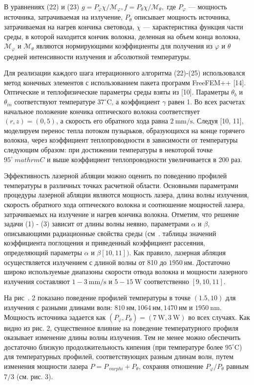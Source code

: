 В уравнениях (22) и (23)
$g=P_{\varphi} \chi / \mathcal{M}_{\varphi}, f=P_{\theta} \chi / \mathcal{M}_{ \theta},$
где $P_{\varphi}$ — мощность источника, затрачиваемая на излучение, $P_{\theta}$ описывает мощность источника,
затрачиваемая на нагрев кончика световода, $\chi$ — характеристика функция части среды,
в которой находится кончик волокна, деленная на объем конца волокна,
$\mathcal{M}_{\varphi}$ и $\mathcal{M}_{\theta}$ являются нормирующими коэффициенты для получения
из $\varphi$ и $\theta$ средней интенсивности излучения и абсолютной температуры.

Для реализации каждого шага итерационного алгоритма (22)-(25) использовался метод конечных
элементов с использованием пакета программ FreeFEM++ [14].
Оптические и теплофизические параметры среды взяты из [10].
Параметры $\theta_{b}$ и $\theta_{i n}$ соответствуют температуре $37^{\circ}\mathrm{C}$,
а коэффициент $\gamma$ равен 1.
Во всех расчетах начальное положение кончика оптического волокна соответствует
$(r, z)=(0,5)$, а скорость его обратного хода равна $2 \mathrm{~mm} / \mathrm{s}$.
Следуя [10, 11], моделируем перенос тепла потоком пузырьков, образующихся на конце горячего волокна,
через коэффициент теплопроводности в зависимости от температуры следующим образом:
при достижении температуры в некоторой точке $95^{\circ} \ mathrm{C}$ и выше коэффициент
теплопроводности увеличивается в 200 раз.

Эффективность лазерной абляции можно оценить по поведению профилей
температуры в различных точках расчетной области.
Основными параметрами процедуры лазерной абляции являются мощность лазера, длина волны излучения,
скорость обратного хода оптического волокна и соотношение мощностей лазера,
затрачиваемых на излучение и нагрев кончика волокна.
Отметим, что решение задачи (1) - (3) зависит от длины волны неявно,
параметрами $\alpha$ и $\beta$, описывающими радиационные свойства среды
(см~. таблицы значений коэффициента поглощения и приведенный коэффициент рассеяния,
определяющий параметры $\alpha$ и $\beta[10,11])$.
Как правило, лазерная абляция осуществляется излучением с длиной волны от 810 до $1950 \mathrm{~нм}$.
Достаточно широко используемые диапазоны скорости отвода волокна и
мощности лазерного излучения составляют
$1-3 \mathrm{~mm}/\mathrm{s}$ и $5-15 \mathrm{~W}$ соответственно $[9, 10,11]$.

На рис~. 2 показано поведение профилей температуры в точке $(1.5,10)$
для излучения с разными длинами волн: $810 \mathrm{~нм}, 1064 \mathrm{~нм}, 1470 \mathrm{~нм}$
и $1950 \mathrm{~nm}$.
Мощность источника задается как
$\left(P_{\varphi}, P_{\theta}\right)=(7 \mathrm{~W}, 3 \mathrm{~W})$ во всех случаях.
Как видно из рис. 2, существенное влияние на поведение температурного профиля
оказывает изменение длины волны излучения.
Тем не менее можно обеспечить достаточно близкую продолжительность кипения
(при температуре более $95^{\circ}\mathrm{C}$)
для температурных профилей, соответствующих разным длинам волн, путем изменения
мощности лазера $P=P_{\ varphi}+P_{\theta}$,
сохраняя отношение $P_{\varphi}/P_{\theta}$ равным $7/3$ (см. рис. 3).

